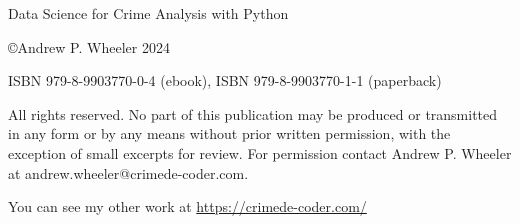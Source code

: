 Data Science for Crime Analysis with Python

\copyright Andrew P. Wheeler 2024

ISBN 979-8-9903770-0-4 (ebook), ISBN 979-8-9903770-1-1 (paperback)

All rights reserved. No part of this publication may be produced or transmitted in any
form or by any means without prior written permission, with the exception of small excerpts for review. 
For permission contact Andrew P. Wheeler at andrew.wheeler@crimede-coder.com.

You can see my other work at \url{https://crimede-coder.com/}

